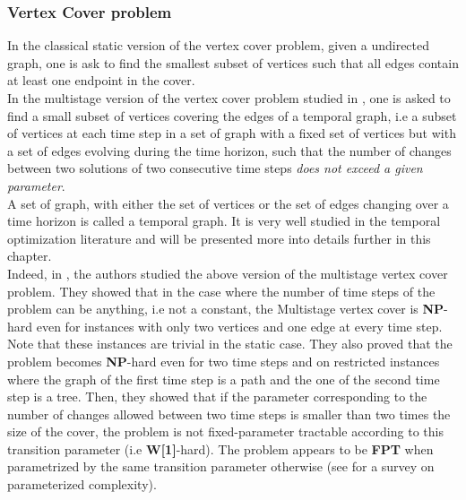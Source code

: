 \documentclass[a4paper]{book}
\begin{document}
\subsubsection{Vertex Cover problem}
In the classical static version of the {\sc vertex cover} problem, given a undirected graph, one is ask to find the smallest subset of vertices such that all edges contain at least one endpoint in the cover.\\
In the multistage version of the {\sc vertex cover} problem studied in \cite{fluschnik2019multistage}, one is asked to find a small subset of vertices covering the edges of a temporal graph, i.e a subset of vertices at each time step in a set of graph with a fixed set of vertices but with a set of edges evolving during the time horizon, such that the number of changes between two solutions of two consecutive time steps \textit{does not exceed a given parameter}.\\
A set of graph, with either the set of vertices or the set of edges changing over a time horizon is called a temporal graph. It is very well studied in the temporal optimization literature and will be presented more into details further in this chapter.\\


Indeed, in \cite{fluschnik2019multistage}, the authors studied the above version of the {\sc multistage vertex cover} problem.  They showed that in the case where the number of time steps of the problem can be anything, i.e not a constant, the {\sc Multistage vertex cover} is \textbf{NP}-hard even for instances with only two vertices and one edge at every time step. Note that these instances are trivial in the static case. They also proved that the problem becomes \textbf{NP}-hard even for two time steps and on restricted instances where the graph of the first time step is a path and the one of the second time step is a tree. Then, they showed that if the parameter corresponding to the number of changes allowed between two time steps is smaller than two times the size of the cover, the problem is not fixed-parameter tractable according to this transition parameter (i.e \textbf{W[1]}-hard). The problem appears to be \textbf{FPT} when parametrized by the same transition parameter otherwise (see \cite{downey2012parameterized} for a survey on parameterized complexity). \\
\end{document}
